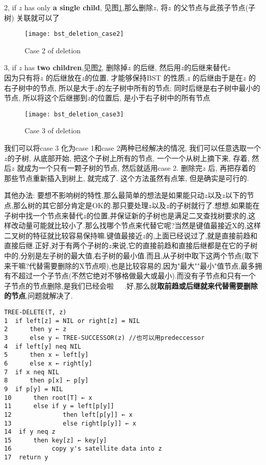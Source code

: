 \documentclass{article}
\begin{document}
2, if $z$ has only \textbf{a single child}, 见图\ref{fig.bst.deletion.case.2},那么删除$z$, 将$z$ 的父节点与此孩子节点(子树) 关联就可以了
\begin{figure}[htbp]
  \centering
  \texttt{[image: bst\_deletion\_case2]}\\
  \caption{Case 2 of deletion}\label{fig.bst.deletion.case.2}
\end{figure}

3, if $z$ has \textbf{two children},见图\ref{fig.bst.deletion.case.3}, 删除掉$z$ 的后继, 然后用$z$的后继来替代$z$\\
因为只有将$z$ 的后继放在$z$的位置, 才能够保持BST 的性质,$z$ 的后继由于是在$z$ 的右子树中的节点, 所以是大于$z$的左子树中所有的节点; 同时后继是右子树中最小的节点, 所以将这个后继挪到$z$的位置后, 是小于右子树中的所有节点\\
\begin{figure}[htbp]
  \centering
  \texttt{[image: bst\_deletion\_case3]}\\
  \caption{Case 3 of deletion}\label{fig.bst.deletion.case.3}
\end{figure}

我们可以将case 3 化为case 1和case 2两种已经解决的情况, 我们可以任意选取一个$z$的子树, 从底部开始, 把这个子树上所有的节点, 一个一个从树上摘下来, 存着, 然后$z$ 就成为一个只有一颗子树的节点, 然后就适用case 2. 删除完$z$ 后, 再把存着的那些节点重新插入到树上, 就完成了. 这个方法虽然有点笨, 但是确实是可行的.

其他办法: 要想不影响树的特性,那么最简单的想法是如果能只动$z$以及$z$以下的节点,那么树的其它部分肯定是OK的.那只要处理$z$以及$z$的子树就行了.想想,如果能在子树中找一个节点来替代$z$的位置,并保证新的子树也是满足二叉查找树要求的,这样改动量可能就比较小了.那么找哪个节点来代替它呢?当然是键值最接近X的,这样二叉树的特征就比较容易保持嘛.键值最接近$z$的,上面已经说过了,就是直接前趋和直接后继.正好,对于有两个子树的$z$来说,它的直接前趋和直接后继都是在它的子树中的,分别是左子树的最大值,右子树的最小值.而且,从子树中取下这两个节点(取下来干嘛?代替需要删除的X节点呗),也是比较容易的,因为"最大""最小"值节点,最多拥有不超过一个子节点(不然它绝对不够格做最大或最小).而没有子节点和只有一个子节点的节点删除,是我们已经会啦~~~.好,那么就\textbf{取前趋或后继就来代替需要删除的节点},问题就解决了.

\begin{verbatim}
TREE-DELETE(T, z)
1  if left[z] = NIL or right[z] = NIL
2      then y ← z
3      else y ← TREE-SUCCESSOR(z) //也可以用predeccessor
4  if left[y] neq NIL
5      then x ← left[y]
6      else x ← right[y]
7  if x neq NIL
8      then p[x] ← p[y]
9  if p[y] = NIL
10      then root[T] ← x
11      else if y = left[p[y]]
12              then left[p[y]] ← x
13              else right[p[y]] ← x
14  if y neq z
15      then key[z] ← key[y]
16           copy y's satellite data into z
17  return y
\end{verbatim}
\end{document}
